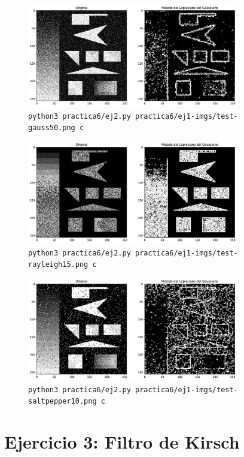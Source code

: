 \documentclass[11pt, spanish]{article}
\begin{document}
\begin{figure}[H]
\centering
    \includegraphics[height=4.5cm]{informe-imgs/ej2-c-test-gauss50.jpg}
    \caption{\texttt{python3 practica6/ej2.py practica6/ej1-imgs/test-gauss50.png c}}
\end{figure}

\begin{figure}[H]
\centering
    \includegraphics[height=4.5cm]{informe-imgs/ej2-c-test-rayleigh15.jpg}
    \caption{\texttt{python3 practica6/ej2.py practica6/ej1-imgs/test-rayleigh15.png c}}
\end{figure}

\begin{figure}[H]
\centering
    \includegraphics[height=4.5cm]{informe-imgs/ej2-c-test-saltpepper10.jpg}
    \caption{\texttt{python3 practica6/ej2.py practica6/ej1-imgs/test-saltpepper10.png c}}
\end{figure}

\newpage
\section{Ejercicio 3: Filtro de Kirsch}
\end{document}
